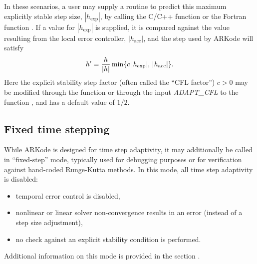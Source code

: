 \documentclass[letterpaper,10pt,english]{sphinxmanual}
\begin{document}
In these scenarios, a user may supply a routine to predict this
maximum explicitly stable step size, \(|h_\text{exp}|\), by calling the
C/C++ function {\hyperref[c_interface/User_callable:c.ARKodeSetStabilityFn]{\emph{}}} or the Fortran
function {\hyperref[f_interface/Usage:f/_/FARKEXPSTABSET]{\emph{}}}.  If a value for
\(|h_\text{exp}|\) is supplied, it is compared against the value
resulting from the local error controller, \(|h_\text{acc}|\), and
the step used by ARKode will satisfy
\begin{gather}
\begin{split}h' = \frac{h}{|h|}\min\{c\, |h_\text{exp}|,\, |h_\text{acc}|\}.\end{split}\notag
\end{gather}
Here the explicit stability step factor (often called the ``CFL
factor'') \(c>0\) may be modified through the function
{\hyperref[c_interface/User_callable:c.ARKodeSetCFLFraction]{\emph{}}} or through the input \emph{ADAPT\_CFL} to
the function {\hyperref[f_interface/Usage:f/_/FARKSETRIN]{\emph{}}}, and has a default value of
\(1/2\).


\subsection{Fixed time stepping}
\label{Mathematics:mathematics-fixedstep}\label{Mathematics:fixed-time-stepping}
While ARKode is designed for time step adaptivity, it may additionally
be called in ``fixed-step'' mode, typically used for debugging purposes
or for verification against hand-coded Runge-Kutta methods.  In this
mode, all time step adaptivity is disabled:
\begin{itemize}
\item {} 
temporal error control is disabled,

\item {} 
nonlinear or linear solver non-convergence results in an error
(instead of a step size adjustment),

\item {} 
no check against an explicit stability condition is performed.

\end{itemize}

Additional information on this mode is provided in the section
{\hyperref[c_interface/User_callable:cinterface-optionalinputs]{\emph{}}}.
\end{document}

